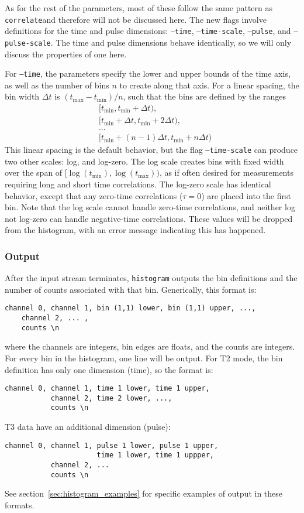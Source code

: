 \documentclass{article}
\newcommand{\correlate}{\texttt{correlate}}
\newcommand{\histogram}{\texttt{histogram}}
\begin{document}
As for the rest of the parameters, most of these follow the same pattern as \correlate and therefore will not be discussed here. The new flags involve definitions for the time and pulse dimensions: \texttt{--time}, \texttt{--time-scale}, \texttt{--pulse},  and \texttt{--pulse-scale}. The time and pulse dimensions behave identically, so we will only discuss the properties of one here.

For \texttt{--time}, the parameters specify the lower and upper bounds of the time axis, as well as the number of bins $n$ to create along that axis. For a linear spacing, the bin width $\Delta t$ is $(t_{\max}-t_{\min})/n$, such that the bins are defined by the ranges
\begin{equation}
\begin{aligned}
&[t_{\min},t_{\min}+\Delta t),\\
&[t_{\min}+\Delta t,t_{\min}+2\Delta t),\\
&\ldots\\
&[t_{\min}+(n-1)\Delta t,t_{\min}+n\Delta t)
\end{aligned}
\end{equation}
This linear spacing is the default behavior, but the flag \texttt{--time-scale} can produce two other scales: log, and log-zero. The log scale creates bins with fixed width over the span of $[\log(t_{\min}),\log(t_{\max}))$, as if often desired for measurements requiring long and short time correlations. The log-zero scale has identical behavior, except that any zero-time correlations ($\tau=0$) are placed into the first bin. Note that the log scale cannot handle zero-time correlations, and neither log not log-zero can handle negative-time correlations. These values will be dropped from the histogram, with an error message indicating this has happened.

\subsubsection{Output}
After the input stream terminates, \histogram{} outputs the bin definitions and the number of counts associated with that bin. Generically, this format is:
\begin{verbatim}
channel 0, channel 1, bin (1,1) lower, bin (1,1) upper, ...,
    channel 2, ... , 
    counts \n
\end{verbatim}
where the channels are integers, bin edges are floats, and the counts are integers. For every bin in the histogram, one line will be output. For T2 mode, the bin definition has only one dimension (time), so the format is:
\begin{verbatim}
channel 0, channel 1, time 1 lower, time 1 upper, 
           channel 2, time 2 lower, ...,
           counts \n
\end{verbatim}
T3 data have an additional dimension (pulse):
\begin{verbatim}
channel 0, channel 1, pulse 1 lower, pulse 1 upper,
                      time 1 lower, time 1 uppper,
           channel 2, ...
           counts \n
\end{verbatim}
See section~\ref{sec:histogram_examples} for specific examples of output in these formats.
\end{document}
